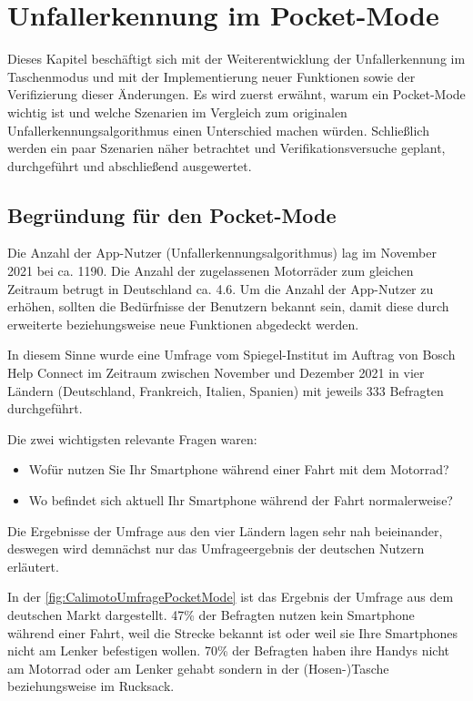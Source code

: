 \chapter{Unfallerkennung im Pocket-Mode}
Dieses Kapitel beschäftigt sich mit der Weiterentwicklung der Unfallerkennung im Taschenmodus und mit der Implementierung neuer Funktionen sowie der Verifizierung dieser Änderungen. Es wird zuerst erwähnt, warum ein Pocket-Mode wichtig ist und welche Szenarien im Vergleich zum originalen Unfallerkennungsalgorithmus einen Unterschied machen würden.
Schließlich werden ein paar Szenarien näher betrachtet und Verifikationsversuche geplant, durchgeführt und abschließend ausgewertet.

\section{Begründung für den Pocket-Mode}
Die Anzahl der App-Nutzer (Unfallerkennungsalgorithmus) lag im November 2021 bei ca. 1190. Die Anzahl der zugelassenen Motorräder zum gleichen Zeitraum betrugt in Deutschland ca. \SI{4,6}{\Million}. Um die Anzahl der App-Nutzer zu erhöhen, sollten die Bedürfnisse der Benutzern bekannt sein, damit diese durch erweiterte beziehungsweise neue Funktionen abgedeckt werden.

In diesem Sinne wurde eine Umfrage vom Spiegel-Institut im Auftrag von Bosch Help Connect im Zeitraum zwischen November und Dezember 2021 in vier Ländern (Deutschland, Frankreich, Italien, Spanien) mit jeweils 333 Befragten durchgeführt.

Die zwei wichtigsten relevante Fragen waren:
\begin{itemize}
	\item Wofür nutzen Sie Ihr Smartphone während einer Fahrt mit dem Motorrad?
	\item Wo befindet sich aktuell Ihr Smartphone während der Fahrt normalerweise?
\end{itemize}

Die Ergebnisse der Umfrage aus den vier Ländern lagen sehr nah beieinander, deswegen wird demnächst nur das Umfrageergebnis der deutschen Nutzern erläutert.

In der \autoref{fig:CalimotoUmfragePocketMode} ist das Ergebnis der Umfrage aus dem deutschen Markt dargestellt. 47\% der Befragten nutzen kein Smartphone während einer Fahrt, weil die Strecke bekannt ist oder weil sie Ihre Smartphones nicht am Lenker befestigen wollen. 70\% der Befragten haben ihre Handys nicht am Motorrad oder am Lenker gehabt sondern in der (Hosen-)Tasche beziehungsweise im Rucksack. 

